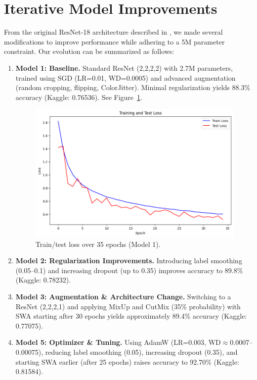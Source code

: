 \documentclass[letterpaper]{article}
\begin{document}
\section{Iterative Model Improvements}

From the original ResNet-18 architecture described in \cite{he2015deep}, we made several modifications to improve performance while adhering to a 5M parameter constraint. Our evolution can be summarized as follows:

\begin{enumerate}
    \item \textbf{Model 1: Baseline.} Standard ResNet (2,2,2,2) with 2.7M parameters, trained using SGD (LR=0.01, WD=0.0005) and advanced augmentation (random cropping, flipping, ColorJitter). Minimal regularization yields 88.3\% accuracy (Kaggle: 0.76536). See Figure~\ref{fig:training_performance_8825}.
    
    \begin{figure}[ht]
    \centering
         \includegraphics[width=0.7\linewidth]{images/traintest_lost-88.25.png}
    \caption{Train/test loss over 35 epochs (Model 1).}
    \label{fig:training_performance_8825}
    \end{figure}

    \item \textbf{Model 2: Regularization Improvements.} Introducing label smoothing (0.05--0.1) and increasing dropout (up to 0.35) improves accuracy to 89.8\% (Kaggle: 0.78232).

    \item \textbf{Model 3: Augmentation \& Architecture Change.} Switching to a ResNet (2,2,2,1) and applying MixUp and CutMix (35\% probability) with SWA starting after 30 epochs yields approximately 89.4\% accuracy (Kaggle: 0.77075).

    \item \textbf{Model 5: Optimizer \& Tuning.} Using AdamW (LR=0.003, WD$\approx$0.0007–0.00075), reducing label smoothing (0.05), increasing dropout (0.35), and starting SWA earlier (after 25 epochs) raises accuracy to 92.70\% (Kaggle: 0.81584).


\end{enumerate}
\end{document}
